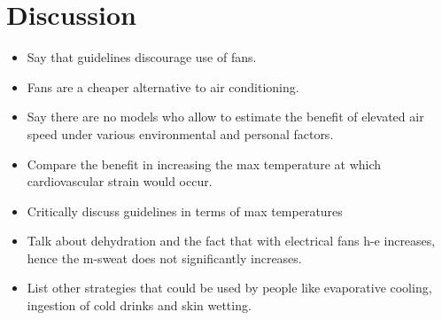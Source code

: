 
\section{Discussion}\label{sec:discussion}

\begin{itemize}
    \item Say that guidelines discourage use of fans.
    \item Fans are a cheaper alternative to air conditioning.
    \item Say there are no models who allow to estimate the benefit of elevated air speed under various environmental and personal factors.
    \item Compare the benefit in increasing the max temperature at which cardiovascular strain would occur.
    \item Critically discuss guidelines in terms of max temperatures
    \item Talk about dehydration and the fact that with electrical fans \ac{h-e} increases, hence the \ac{m-sweat} does not significantly increases. %
    \item List other strategies that could be used by people like evaporative cooling, ingestion of cold drinks and skin wetting.
\end{itemize}
